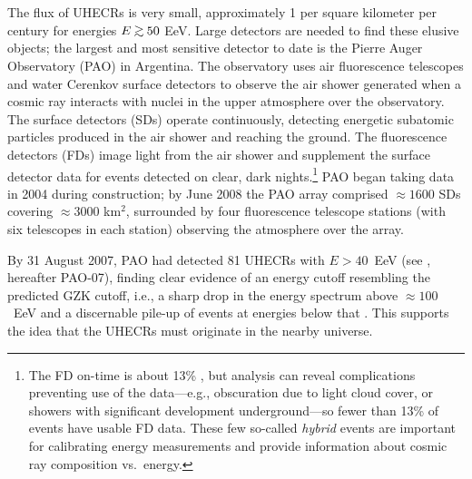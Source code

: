 The flux of UHECRs is very small, approximately 1 per square kilometer per
century for energies $E\gta 50$ EeV.  Large detectors are needed to find
these elusive objects; the largest and most sensitive
detector to date is the Pierre Auger Observatory (PAO) \cite{PAO04-Proto}
in Argentina.  The
observatory uses air fluorescence telescopes and water
Cerenkov surface detectors to observe the air shower generated when a cosmic
ray interacts with nuclei in the upper atmosphere over the
observatory.  The surface detectors (SDs) operate continuously, detecting
energetic subatomic particles produced in the air shower and reaching the
ground.  The fluorescence detectors (FDs) image light from the air shower and
supplement the surface detector data for events detected on clear, dark
nights.\footnote{The FD on-time is about 13\% \cite{PAO10-GZK}, but analysis
can reveal complications preventing use of the data---e.g., obscuration due to
light cloud cover, or showers with significant development underground---so
fewer than 13\% of events have usable FD data.  These few so-called {\em
hybrid} events are important for calibrating energy measurements and provide
information about cosmic ray composition vs.\ energy.}
PAO began taking data in 2004 during construction; by 
June 2008 the PAO array comprised $\approx 1600$ SDs
covering $\approx 3000$ km$^2$, surrounded by four
fluorescence telescope stations (with six telescopes in each station)
observing the atmosphere over the array.

By 31 August 2007, PAO had detected 81 UHECRs with $E > 40$~EeV
(see \cite{PAO07-Aniso}, hereafter PAO-07), finding clear evidence of
an energy cutoff resembling the predicted GZK cutoff, i.e., a sharp drop in
the energy spectrum above $\approx 100$~EeV and a discernable pile-up of
events at energies below that \cite{PAO10-GZK}. This supports the idea that
the UHECRs must originate in the nearby universe.

